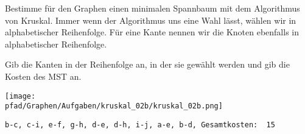﻿\question[3]
Bestimme für den Graphen einen minimalen Spannbaum mit dem Algorithmus von Kruskal. Immer wenn der Algorithmus uns eine
Wahl lässt, wählen wir in alphabetischer Reihenfolge. Für eine Kante nennen wir die Knoten ebenfalls
in alphabetischer Reihenfolge.

Gib die Kanten in der Reihenfolge an, in der sie gewählt werden und gib die Kosten des MST an.

\texttt{[image: \\pfad/Graphen/Aufgaben/kruskal\_02b/kruskal\_02b.png]}
\begin{solutionbox}{4cm}
\begin{lstlisting}
b-c, c-i, e-f, g-h, d-e, d-h, i-j, a-e, b-d, Gesamtkosten:  15
\end{lstlisting}

\end{solutionbox}
